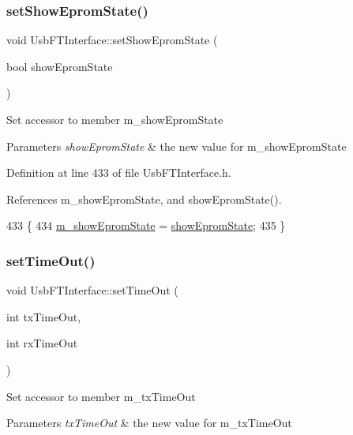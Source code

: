 \subsubsection{\texorpdfstring{set\+Show\+Eprom\+State()}{setShowEpromState()}}
{\footnotesize\ttfamily void Usb\+F\+T\+Interface\+::set\+Show\+Eprom\+State (\begin{DoxyParamCaption}\item[{bool}]{show\+Eprom\+State }\end{DoxyParamCaption})\hspace{0.3cm}{\ttfamily [inline]}}

Set accessor to member m\+\_\+show\+Eprom\+State 
\begin{DoxyParams}{Parameters}
{\em show\+Eprom\+State} & the new value for m\+\_\+show\+Eprom\+State \\
\hline
\end{DoxyParams}


Definition at line 433 of file Usb\+F\+T\+Interface.\+h.



References m\+\_\+show\+Eprom\+State, and show\+Eprom\+State().


\begin{DoxyCode}
433                                                \{
434     \hyperlink{classUsbFTInterface_aa5c215777af41de94a2b371c59c88c7c}{m\_showEpromState} = \hyperlink{classUsbFTInterface_a6e9b97244aaac289792fbef24daad33e}{showEpromState};
435   \}
\end{DoxyCode}
\mbox{\label{classUsbFTInterface_a62d90f80a81d1decd66f9b9f10cb8dc6}} 
\subsubsection{\texorpdfstring{set\+Time\+Out()}{setTimeOut()}}
{\footnotesize\ttfamily void Usb\+F\+T\+Interface\+::set\+Time\+Out (\begin{DoxyParamCaption}\item[{int}]{tx\+Time\+Out,  }\item[{int}]{rx\+Time\+Out }\end{DoxyParamCaption})\hspace{0.3cm}{\ttfamily [inline]}}

Set accessor to member m\+\_\+tx\+Time\+Out 
\begin{DoxyParams}{Parameters}
{\em tx\+Time\+Out} & the new value for m\+\_\+tx\+Time\+Out \\
\hline
\end{DoxyParams}


